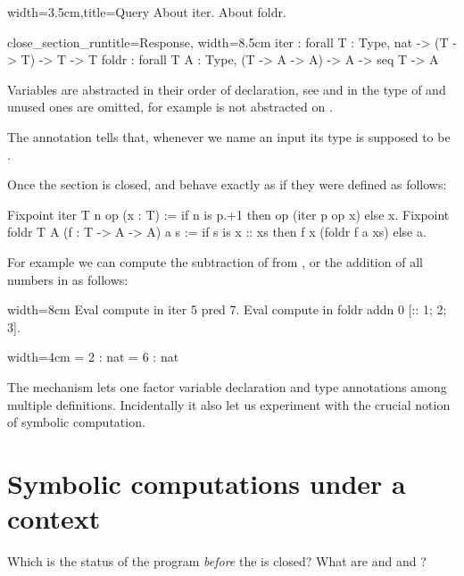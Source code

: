 \begin{coq}{}{width=3.5cm,title=Query}
About iter.
About foldr.
$~$
\end{coq}
\begin{coqout}{close_section_run}{title=Response, width=8.5cm}
iter : forall T : Type, nat -> (T -> T) -> T -> T
foldr :
  forall T A : Type, (T -> A -> A) -> A -> seq T -> A
\end{coqout}

Variables are abstracted in their order of declaration, see  and 
in the type of  and unused ones are omitted, for example 
is not abstracted on .

The  annotation tells \Coq{} that, whenever we name
an input  its type is supposed to be .

Once the section is closed,  and  behave exactly as
if they were defined as follows:

\begin{coq}{}{}
Fixpoint iter T n op (x : T) :=
  if n is p.+1 then op (iter p op x) else x.
Fixpoint foldr T A (f : T -> A -> A) a s :=
  if s is x :: xs then f x (foldr f a xs) else a.
\end{coq}

For example we can compute the subtraction of  from , or the 
addition of all numbers in \C{[:: 1; 2; 3]}
as follows:

\begin{coq}{}{width=8cm}
Eval compute in iter 5 pred 7.
Eval compute in foldr addn 0 [:: 1; 2; 3].
\end{coq}
\begin{coqout}{}{width=4cm}
 = 2 : nat
 = 6 : nat
\end{coqout}

The  mechanism lets one factor variable declaration and type
annotations among multiple definitions.  Incidentally it also let us
experiment with the crucial notion of symbolic computation.

\section{Symbolic computations under a context}

Which is the status of the  program \emph{before} the
 is closed?  What are  and  and ?

